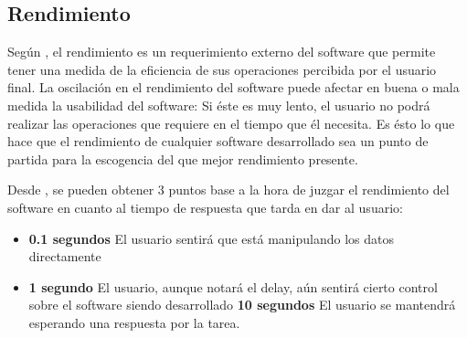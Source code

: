 \subsection{Rendimiento}

Según \cite{computer_science}, el rendimiento es un requerimiento externo del software que permite tener una medida de la eficiencia de sus operaciones percibida por el usuario final. La oscilación en el rendimiento del software puede afectar en buena o mala medida la usabilidad del software: Si éste es muy lento, el usuario no podrá realizar las operaciones que requiere en el tiempo que él necesita. Es ésto lo que hace que el rendimiento de cualquier software desarrollado sea un punto de partida para la escogencia del que mejor rendimiento presente.

Desde \cite{time_response}, se pueden obtener 3 puntos base a la hora de juzgar el rendimiento del software en cuanto al tiempo de respuesta que tarda en dar al usuario:

\begin{itemize}
	\item \textbf{0.1 segundos} El usuario sentirá que está manipulando los datos directamente
	\item \textbf{1 segundo} El usuario, aunque notará el delay, aún sentirá cierto control sobre el software siendo desarrollado
	\textbf{10 segundos} El usuario se mantendrá esperando una respuesta por la tarea.
\end{itemize}